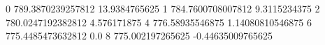 0 789.3870239257812 13.9384765625
1 784.7600708007812 9.3115234375
2 780.0247192382812 4.576171875
4 776.58935546875 1.14080810546875
6 775.4485473632812 0.0
8 775.002197265625 -0.44635009765625
